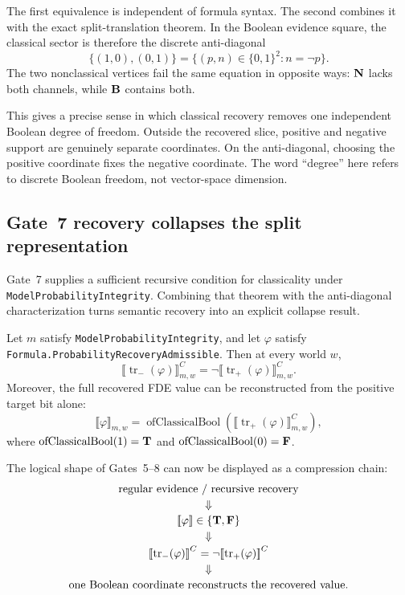The first equivalence is independent of formula syntax.  The second combines it with
the exact split-translation theorem.  In the Boolean evidence square, the classical
sector is therefore the discrete anti-diagonal
\[
  \{(1,0),(0,1)\}
  =
  \{(p,n)\in\{0,1\}^{2}: n=\neg p\}.
\]
The two nonclassical vertices fail the same equation in opposite ways:
\(\mathbf{N}\) lacks both channels, while \(\mathbf{B}\) contains both.

This gives a precise sense in which classical recovery removes one independent
Boolean degree of freedom.  Outside the recovered slice, positive and negative
support are genuinely separate coordinates.  On the anti-diagonal, choosing the
positive coordinate fixes the negative coordinate.  The word ``degree'' here refers
to discrete Boolean freedom, not vector-space dimension.

\subsection{Gate~7 recovery collapses the split representation}

Gate~7 supplies a sufficient recursive condition for classicality under
\texttt{ModelProbabilityIntegrity}.  Combining that theorem with the anti-diagonal
characterization turns semantic recovery into an explicit collapse result.

\begin{corollary}
\label{cor:probability-recovery-cpel-collapse}
Let \(m\) satisfy \texttt{ModelProbabilityIntegrity}, and let \(\varphi\) satisfy
\texttt{Formula.ProbabilityRecoveryAdmissible}.  Then at every world \(w\),
\[
  \llbracket\operatorname{tr}_{-}(\varphi)\rrbracket^{C}_{m,w}
  =
  \neg\llbracket\operatorname{tr}_{+}(\varphi)\rrbracket^{C}_{m,w}.
\]
Moreover, the full recovered FDE value can be reconstructed from the positive target
bit alone:
\[
  \llbracket\varphi\rrbracket_{m,w}
  =
  \operatorname{ofClassicalBool}
  \left(
    \llbracket\operatorname{tr}_{+}(\varphi)\rrbracket^{C}_{m,w}
  \right),
\]
where \(\operatorname{ofClassicalBool}(1)=\mathbf{T}\) and
\(\operatorname{ofClassicalBool}(0)=\mathbf{F}\).
\statusverified
\end{corollary}

The logical shape of Gates~5--8 can now be displayed as a compression chain:
\[
\begin{array}{c}
\text{regular evidence / recursive recovery}\\[2pt]
\Downarrow\\[2pt]
\mathopen{[\![}\varphi\mathclose{]\!]}\in\{\mathbf{T},\mathbf{F}\}\\[2pt]
\Downarrow\\[2pt]
\mathopen{[\![}\operatorname{tr}_{-}(\varphi)\mathclose{]\!]}^{C}
=\neg\mathopen{[\![}\operatorname{tr}_{+}(\varphi)\mathclose{]\!]}^{C}\\[2pt]
\Downarrow\\[2pt]
\text{one Boolean coordinate reconstructs the recovered value.}
\end{array}
\]

